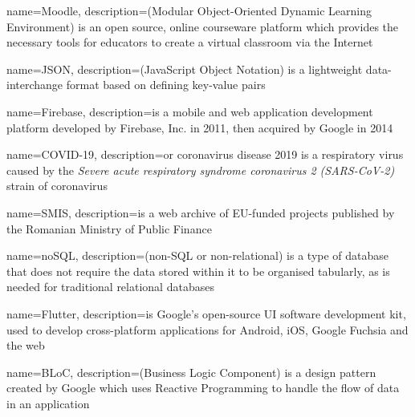 {
        name=Moodle,
        description={(Modular Object-Oriented Dynamic Learning Environment) is an open source, online courseware platform which provides the necessary tools for educators to create a virtual classroom via the Internet\cite{crosslin2010course}}
}

{
        name=JSON,
        description={(JavaScript Object Notation) is a lightweight data-interchange format based on defining key-value pairs}
}

{
        name=Firebase,
        description={is a mobile and web application development platform developed by Firebase, Inc. in 2011, then acquired by Google in 2014}
}

{
        name=COVID-19,
        description={or coronavirus disease 2019 is a respiratory virus caused by the \textit{Severe acute respiratory syndrome coronavirus 2 (SARS-CoV-2)} strain of coronavirus}
}

{
        name=SMIS,
        description=is a web archive of EU-funded projects published by the Romanian Ministry of Public Finance
}

{
        name=noSQL,
        description={(non-SQL or non-relational) is a type of database that does not require the data stored within it to be organised tabularly, as is needed for traditional relational databases}
}

{
        name=Flutter,
        description={is Google's open-source UI software development kit, used to develop cross-platform applications for Android, iOS, Google Fuchsia and the web}
}

{
        name=BLoC,
        description={(Business Logic Component) is a design pattern created by Google which uses Reactive Programming to handle the flow of data in an application}
}